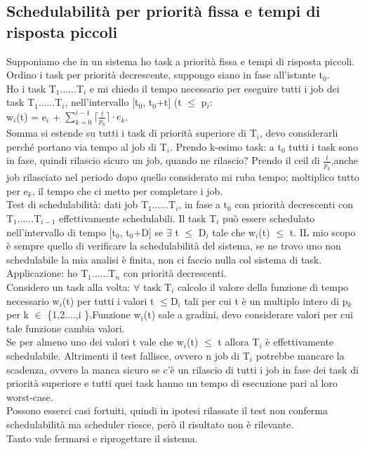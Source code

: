 \documentclass[12pt, oneside]{extbook}
\begin{document}
\subsection{Schedulabilità per priorità fissa e tempi di risposta piccoli}
Supponiamo che in un sistema ho task a priorità fissa e tempi di risposta piccoli.\\ Ordino i task per priorità decrescente, suppongo siano in fase all'istante t$_{0}$.\\ Ho i task T$_{1}$......T$_{i}$ e mi chiedo il tempo necessario per eseguire tutti i job dei task T$_{1}$......T$_{i}$, nell'intervallo [t$_{0}$, t$_{0}$+t] (t $\leq$ p$_{i}$:\\
w$_{i}$(t) = e$_{i}$ +  $\sum\limits_{k=0}^{i-1} \lceil\frac{t}{p_{k}}\rceil \cdot e_{k}$.\\ Somma si estende su tutti i task di priorità superiore di T$_{i}$, devo considerarli perché portano via tempo al job di T$_{i}$. Prendo k-esimo task: a t$_{0}$ tutti i task sono in fase, quindi rilascio sicuro un job, quando ne rilascio? Prendo il ceil di $\frac{t}{p_{k}}$,anche job rilasciato nel periodo dopo quello considerato mi ruba tempo; moltiplico tutto per e$_{k}$, il tempo che ci metto per completare i job.\\ Test di schedulabilità: dati job T$_{1}$......T$_{i}$, in fase a t$_{0}$ con priorità decrescenti con T$_{1}$......T$_{i-1}$ effettivamente schedulabili. Il task T$_{i}$ può essere schedulato nell'intervallo di tempo [t$_{0}$, t$_{0}$+D] se $\exists$ t $\leq$ D$_{i}$ tale che w$_{i}$(t) $\leq$ t. IL mio scopo è sempre quello di verificare la schedulabilità del sistema, se ne trovo uno non schedulabile la mia analisi è finita, non ci faccio nulla col sistema di task.\\ Applicazione: ho T$_{1}$......T$_{n}$ con priorità decrescenti. \\Considero un task alla volta: $\forall$ task T$_{i}$  calcolo il valore della funzione di tempo necessario w$_{i}$(t) per tutti i valori t $\leq$D$_{i}$ tali per cui t è un multiplo intero di p$_{k}$ per k $\in$ \{1,2....,i \}.Funzione w$_{i}$(t) sale a gradini, devo considerare valori per cui tale funzione cambia valori.\\ Se per almeno uno dei valori t vale che w$_{i}$(t) $\leq$ t allora T$_{i}$ è effettivamente schedulabile. Altrimenti il test fallisce, ovvero n job di T$_{i}$ potrebbe mancare la scadenza, ovvero la manca sicuro se c'è un rilascio di tutti i job in fase dei task di priorità superiore e tutti quei task hanno un tempo di esecuzione pari al loro worst-case.\\ Possono esserci casi fortuiti, quindi in ipotesi rilassate il test non conferma schedulabilità ma scheduler riesce, però il risultato non è rilevante.\\Tanto vale fermarsi e riprogettare il sistema.\\
\end{document}
